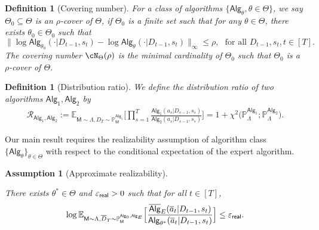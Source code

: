 \documentclass[10pt]{article}
\newtheorem{definition}[theorem]{Definition}
\newtheorem{assumption}{Assumption}
\renewcommand{\epsilon}{\varepsilon}
\newcommand{\<}{\left\langle}
\renewcommand{\>}{\right\rangle}
\newcommand{\E}{\mathbb{E}}
\renewcommand{\P}{\mathbb{P}}
\newcommand{\inst}{{\mathsf{M}}}
\newcommand{\widebar}[1]{\overline{#1}}
\newcommand{\state}{{s}}
\newcommand{\action}{{a}}
\newcommand{\eaction}{{\widebar{a}}}
\newcommand{\totlen}{{T}}
\newcommand{\sAlg}{{\mathsf{Alg}}}
\newcommand{\osAlg}{\overline{\mathsf{Alg}}}
\newcommand{\dset}{{D}}
\newcommand{\adset}{{\widebar{D}}}
\newcommand{\Par}{{\theta}}
\newcommand{\Parspace}{{\Theta}}
\newcommand{\TruePar}{{\theta^*}}
\newcommand{\prior}{{\Lambda}}
\newcommand{\shortexp}{{E}}
\newcommand{\geneps}{{\epsilon}_{\sf real}}
\newcommand{\distratio}{{\mathcal{R}}}
\begin{document}
\begin{definition}[Covering number]\label{def:cover_number_general} For a class of algorithms $\{\sAlg_\Par,\Par\in\Parspace\}$, 
we say $\Parspace_0 \subseteq\Parspace$ is an  $\rho$-cover of $\Parspace$, if $\Parspace_0$ is a finite set such that for any $\Par\in\Parspace$, there exists $\Par_0\in\Parspace_0$ such that 
\[
\|\log \sAlg_{\Par_0}(\cdot|\dset_{t-1},\state_t)-\log \sAlg_{\Par}(\cdot|\dset_{t-1},\state_t)\|_{\infty}\leq\rho,~~~ \text{for all } \dset_{t-1},\state_t, t\in[\totlen].
\]
The covering number $\cN_{\Parspace}(\rho)$ is the minimal cardinality of $\Parspace_0$ such that $\Parspace_0$ is a $\rho$-cover of $\Parspace$.
\end{definition}
















\begin{definition}[Distribution ratio]\label{def:dist_ratio}
\label{def:distribution-ratio}
We define the distribution ratio of two algorithms $\sAlg_1,\sAlg_2$ by
\begin{align*}\distratio_{\sAlg_1,\sAlg_2}
:=
\E_{\inst\sim\prior,\dset_\totlen\sim\P_\inst^{\sAlg_1}}
\Big[\prod_{s=1}^{\totlen}\frac{\sAlg_1(\action_s|\dset_{s-1},\state_s)}{\sAlg_2(\action_s|\dset_{s-1},\state_s)}\Big] = 1 + \chi^2\Big( \P_\prior^{\sAlg_1};\P_\prior^{\sAlg_2} \Big).
\end{align*}
\end{definition}



Our main result requires the realizability assumption of algorithm class $\{ \sAlg_\Par\}_{\Par \in \Parspace}$ with respect to the conditional expectation of the expert algorithm. 

\begin{assumption}[Approximate realizability]
\label{asp:realizability}

There exists $\TruePar\in\Parspace$ and $\geneps > 0$ such that for all $t\in[\totlen]$, 
\begin{align}
\label{eqn:plc_approx_general}
\log\E_{\inst \sim \prior, \adset_\totlen \sim \P_{\inst}^{\sAlg_0,\sAlg_\shortexp}}\Big[\frac{\osAlg_{\shortexp}(\eaction_t|\dset_{t-1},\state_t )}{\sAlg_\TruePar(\eaction_t|\dset_{t-1},\state_t )}\Big] \le \geneps. 
\end{align}

\end{assumption}
\end{document}
